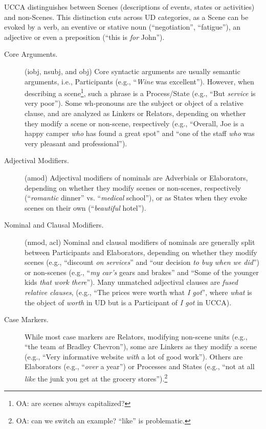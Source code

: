 \documentclass[11pt,a4paper]{article}
\newcommand{\oa}[1]{\footnote{\color{red}OA: #1}}
\begin{document}
UCCA distinguishes between Scenes (descriptions of events, states or activities)
and non-Scenes. 
This distinction cuts across UD categories,
as a Scene can be evoked by a verb, an eventive or stative
noun (``negotiation'', ``fatigue''),
an adjective or even a preposition (``this is \textit{for} John'').
\begin{description}
    \item[Core Arguments.] (iobj, nsubj, and obj)
    Core syntactic arguments are usually semantic arguments,
    i.e., Participants (e.g., ``\textit{Wine} was excellent'').
    However, when describing a scene\oa{are scenes always capitalized?}, such a phrase is a Process/State
    (e.g., ``But \textit{service} is very poor'').
    Some wh-pronouns are the subject or object of a relative clause, and
    are analyzed as Linkers or Relators,
    depending on whether they modify a scene or non-scene, respectively
    (e.g., ``Overall, Joe is a happy camper \textit{who} has found a great spot''
    and ``one of the staff \textit{who} was very pleasant and professional'').
    \item[Adjectival Modifiers.] (amod) 
    Adjectival modifiers of nominals are Adverbials or Elaborators,
    depending on whether they modify scenes or non-scenes, respectively
    (``\textit{romantic} dinner'' vs. ``\textit{medical} school''), or
    as States when
    they evoke scenes on their own (``\textit{beautiful} hotel'').
    \item[Nominal and Clausal Modifiers.] (nmod, acl)
    Nominal and clausal modifiers of nominals
    are generally split between Participants and Elaborators,
    depending on whether they modify scenes
    (e.g., ``discount \textit{on services}'' and
    ``our decision \textit{to buy when we did}'')
    or non-scenes (e.g., ``\textit{my car's} gears and brakes'' and
    ``Some of the younger kids \textit{that work there}'').
    Many unmatched adjectival clauses are
    \textit{fused relative clauses},
    (e.g., ``The prices were worth what \textit{I got}'',
    where \textit{what} is the object of \textit{worth} in UD but
    is a Participant of \textit{I got} in UCCA).
    \item[Case Markers.]
    While most case markers are Relators,
    modifying non-scene units (e.g., ``the team \textit{at} Bradley Chevron''),
    some are Linkers as they modify a scene
    (e.g., ``Very informative website \textit{with} a lot of good work'').
    Others are Elaborators (e.g., ``\textit{over} a year'') or Processes and States
    (e.g., ``not at all \textit{like} the junk you get at the grocery stores'').\oa{can we switch an example? ``like'' is problematic.}
    

\end{description}
\end{document}
